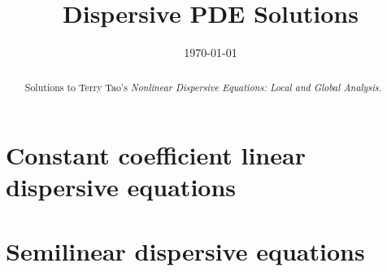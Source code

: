 \documentclass[10pt, reqno]{amsart}
\title
{
	\large Dispersive PDE Solutions
}
\date{\today}
\begin{document}
\maketitle

\begin{abstract}
	Solutions to Terry Tao's \textit{Nonlinear Dispersive Equations: Local and Global Analysis}.
\end{abstract}


\tableofcontents
\clearpage

\section{Constant coefficient linear dispersive equations}



\section{Semilinear dispersive equations}


\end{document}
